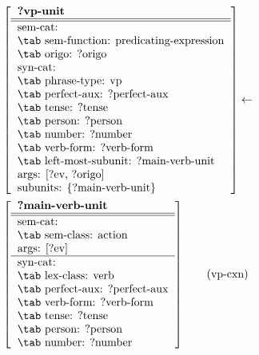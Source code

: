  
\begin{footnotesize}
\begin{align*}&\left[
\begin{tabular}{l}
{\bf ?vp-unit}\\
\hline \hline sem-cat: \\
\tab sem-function: predicating-expression\\
\tab origo: ?origo\\
syn-cat: \\
\tab phrase-type: vp\\
\tab perfect-aux: ?perfect-aux\\
\tab tense: ?tense\\
\tab person: ?person\\
\tab number: ?number\\
\tab verb-form: ?verb-form\\
\tab left-most-subunit: ?main-verb-unit\\
args: \lbrack ?ev, ?origo\rbrack\\
subunits: \{?main-verb-unit\}\\
\end{tabular}
\right]\leftarrow \\
&\left[
\begin{tabular}{l}
{\bf ?main-verb-unit}\\
\hline \hline sem-cat: \\
\tab sem-class: action\\
args: \lbrack ?ev\rbrack\\
\hline syn-cat: \\
\tab lex-class: verb\\
\tab perfect-aux: ?perfect-aux\\
\tab verb-form: ?verb-form\\
\tab tense: ?tense\\
\tab person: ?person\\
\tab number: ?number\\
\end{tabular}
\right]\tag{vp-cxn}
\end{align*}
\end{footnotesize}